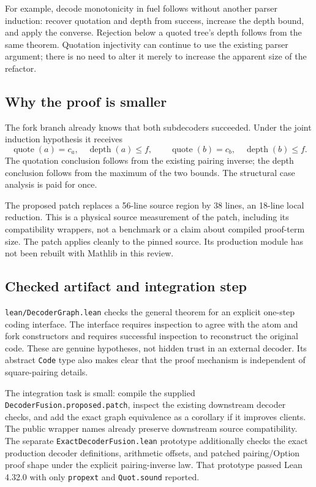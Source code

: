 \documentclass[11pt]{article}
\theoremstyle{remark}\newtheorem{remark}[theorem]{Remark}
\newcommand{\code}[1]{\nolinkurl{#1}}
\begin{document}
For example, decode monotonicity in fuel follows without another parser induction: recover quotation and depth from success, increase the depth bound, and apply the converse. Rejection below a quoted tree's depth follows from the same theorem. Quotation injectivity can continue to use the existing parser argument; there is no need to alter it merely to increase the apparent size of the refactor.

\subsection{Why the proof is smaller}

The fork branch already knows that both subdecoders succeeded. Under the joint induction hypothesis it receives
\[
  \operatorname{quote}(a)=c_a,\quad \operatorname{depth}(a)\le f,
  \qquad
  \operatorname{quote}(b)=c_b,\quad \operatorname{depth}(b)\le f.
\]
The quotation conclusion follows from the existing pairing inverse; the depth conclusion follows from the maximum of the two bounds. The structural case analysis is paid for once.

The proposed patch replaces a 56-line source region by 38 lines, an 18-line local reduction. This is a physical source measurement of the patch, including its compatibility wrappers, not a benchmark or a claim about compiled proof-term size. The patch applies cleanly to the pinned source. Its production module has not been rebuilt with Mathlib in this review.

\subsection{Checked artifact and integration step}

\code{lean/DecoderGraph.lean} checks the general theorem for an explicit one-step coding interface. The interface requires inspection to agree with the atom and fork constructors and requires successful inspection to reconstruct the original code. These are genuine hypotheses, not hidden trust in an external decoder. Its abstract \code{Code} type also makes clear that the proof mechanism is independent of square-pairing details.

The integration task is small: compile the supplied \code{DecoderFusion.proposed.patch}, inspect the existing downstream decoder checks, and add the exact graph equivalence as a corollary if it improves clients. The public wrapper names already preserve downstream source compatibility. The separate \code{ExactDecoderFusion.lean} prototype additionally checks the exact production decoder definitions, arithmetic offsets, and patched pairing/Option proof shape under the explicit pairing-inverse law. That prototype passed Lean 4.32.0 with only \code{propext} and \code{Quot.sound} reported.
\end{document}
